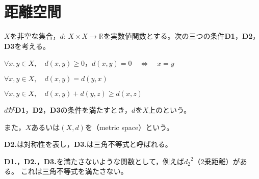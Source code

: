 \documentclass[uplatex]{jsarticle}
\begin{document}
\fi

\section{距離空間}

\begin{teigi}
    $X$を非空な集合，$d: \, X \times X \to \mathbb{R}$を実数値関数とする。次の三つの条件{\bf D1}，{\bf D2}，{\bf D3}を考える。
    
     $\forall x, y \in X, \quad d(x,y) \ge 0$，\qquad $d(x,y) = 0 \quad \Longleftrightarrow \quad x = y$
    
     $\forall x, y \in X, \quad d(x,y) = d(y,x)$
    
     $\forall x, y \in X, \quad d(x,y) + d(y,z) \ge d(x,z)$
    
    $d$が{\bf D1}，{\bf D2}，{\bf D3}の条件を満たすとき，$d$を$X$上のという。

    また，$X$あるいは$(X,d)$を（metric space）という。
\end{teigi}

{\bf D2.}は対称性を表し，{\bf D3.}は三角不等式と呼ばれる。

{\bf D1.}，{\bf D2.}，{\bf D3.}を満たさないような関数として，例えば${d_{2}}^{2}$（2乗距離）がある。
これは三角不等式を満たさない。
\end{document}
